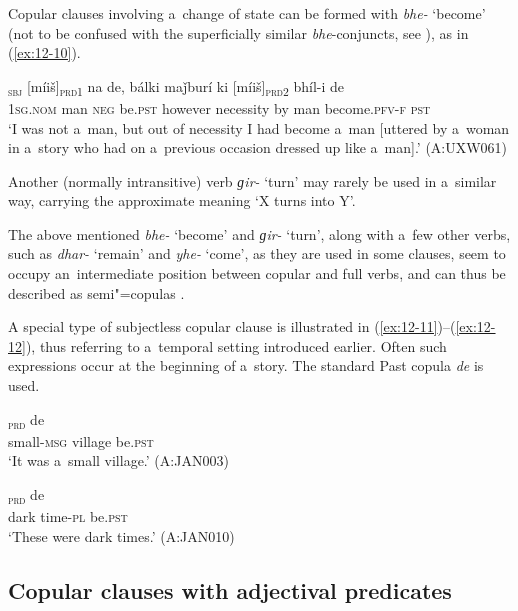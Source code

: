 Copular clauses involving a~change of state can be formed with \textit{bhe-} `become' (not to be confused with the superficially similar \textit{bhe}-conjuncts, see ), as in (\ref{ex:12-10}).

\begin{exe}
\ex
\label{ex:12-10}
\gll [ma]\textsubscript{\textsc{sbj}} [míiš]\textsubscript{\textsc{prd1}} na de, bálki maǰburí ki [míiš]\textsubscript{\textsc{prd2}} bhíl-i de \\
\textsc{1sg.nom} man \textsc{neg} be.\textsc{pst}  however necessity by man become.\textsc{pfv-f} \textsc{pst} \\
\glt `I was not a~man, but out of necessity I had become a~man [uttered by a~woman in a~story who had on a~previous occasion dressed up like a~man].' (A:UXW061)
\end{exe}

Another (normally intransitive) verb \textit{ɡir-} `turn' may rarely be used in a~similar way, carrying the approximate meaning `X turns into Y'.



The above mentioned \textit{bhe-} `become' and \textit{ɡir-} `turn', along with a~few other verbs, such as \textit{dhar-} `remain' and \textit{yhe-} `come', as they are used in some clauses, seem to occupy an~intermediate position between copular and full verbs, and can thus be described as semi"=copulas \citep[5--6]{pustet2003}. 



A special type of subjectless copular clause is illustrated in (\ref{ex:12-11})--(\ref{ex:12-12}), thus referring to a~temporal setting introduced earlier. Often such expressions occur at the beginning of a~story. The standard Past copula \textit{de} is used.

\begin{exe}
\ex
\label{ex:12-11}
\textsubscript{\textsc{prd}} de \\
small-\textsc{msg} village be.\textsc{pst} \\
\glt `It was a~small village.' (A:JAN003)
\end{exe}
\begin{exe}
\ex
\label{ex:12-12}
\textsubscript{\textsc{prd}} de \\
dark time-\textsc{pl} be.\textsc{pst} \\
\glt `These were dark times.' (A:JAN010)
\end{exe}

\subsection{Copular clauses with adjectival predicates}
\label{subsec:12-1-2}



